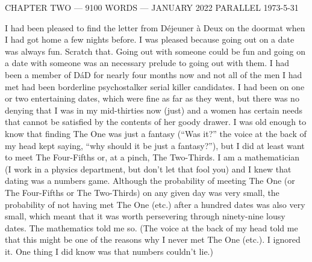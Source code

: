 {\parindent=0pt {\obeylines
{\twelvess CHAPTER TWO --- 9100 WORDS --- JANUARY 2022}
{\twelvess PARALLEL 1973-5-31}}
\vskip 1cm

\twelverm
I had been pleased to find the letter from D{\'e}jeuner {\`a} Deux on the
doormat when I had got home a few nights before. I was pleased because
going out on a date was always fun. Scratch that. Going out with
someone could be fun and going on a date with someone was an necessary prelude to going
out with them. I had been a member of D{\'a}D for nearly four months now and not all of the men I
had met had been borderline psychostalker serial killer candidates.
I had been on one or two entertaining dates, which were fine as far as they went, but there was no denying that I was in my mid-thirties now (just) and a women has
certain needs that cannot be satisfied by the contents of her goody
drawer. I was old enough to know that
finding The One was just a fantasy (``Was it?'' the voice at the
back of my head kept saying, ``why should it be just a fantasy?''), but I did
at least want to meet The Four-Fifths or, at a pinch, The
Two-Thirds. I am a mathematician (I work in a physics department,
but don't let that fool you) and I knew that dating was a numbers
game. Although the probability of meeting The One (or The
Four-Fifths or The Two-Thirds) on any given day was very small, the
probability of not having met The One (etc.) after a hundred dates
was also very small, which meant that it was worth persevering through ninety-nine lousy dates. The mathematics
told me so. (The voice at the back of my head told me that this
might be one of the reasons why I never met The One (etc.). I
ignored it. One thing I did know was that numbers couldn't lie.)}


